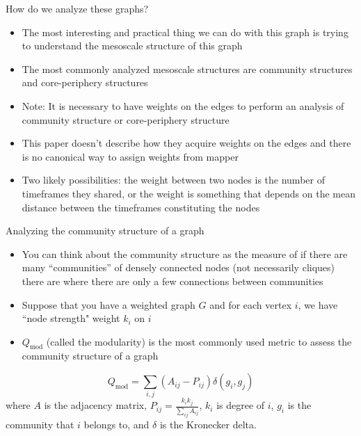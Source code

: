 \documentclass[handout]{beamer}
\begin{document}
\begin{frame}{How do we analyze these graphs?}
    \begin{itemize}
        \item The most interesting and practical thing we can do with this graph is trying to understand the mesoscale structure of this graph \pause
        \item The most commonly analyzed mesoscale structures are community structures and core-periphery structures \pause
        \item Note: It is necessary to have weights on the edges to perform an analysis of community structure or core-periphery structure
        \item This paper doesn't describe how they acquire weights on the edges and there is no canonical way to assign weights from mapper \pause
        \item Two likely possibilities: the weight between two nodes is the number of timeframes they shared, or the weight is something that depends on the mean distance between the timeframes constituting the nodes
    \end{itemize}
\end{frame}

\begin{frame}{Analyzing the community structure of a graph}
    \begin{itemize}
        \item You can think about the community structure as the measure of if there are many ``communities'' of densely connected nodes (not necessarily cliques) there are where there are only a few connections between communities \pause
        \item Suppose that you have a weighted graph $G$ and for each vertex $i$, we have ``node strength" weight $k_i$ on $i$ \pause
        \item $Q_{\mathrm{mod}}$ (called the modularity) is the most commonly used metric to assess the community structure of a graph\cite{community} \pause
    \end{itemize}
    \[Q_{\mathrm{mod}} = \sum_{i,j} \left(A_{ij} - P_{ij}\right)\delta(g_i, g_j)\]
    where $A$ is the adjacency matrix, $P_{ij} = \frac{k_i k_j}{\sum_{ij}A_{ij}}$, $k_i$ is degree of $i$, $g_i$ is the community that $i$ belongs to, and $\delta$ is the Kronecker delta.
\end{frame}
\end{document}
